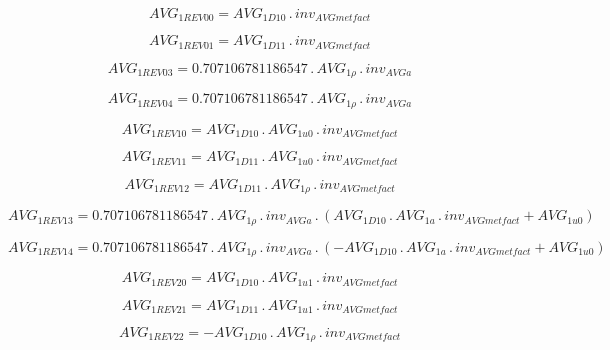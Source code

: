\documentclass{article}
\begin{document}
\begin{dmath}AVG_{1 REV 00} = AVG_{1 D10} \,.\, inv_{AVG met fact}\end{dmath}

\begin{dmath}AVG_{1 REV 01} = AVG_{1 D11} \,.\, inv_{AVG met fact}\end{dmath}

\begin{dmath}AVG_{1 REV 03} = 0.707106781186547 \,.\, AVG_{1 \rho} \,.\, inv_{AVG a}\end{dmath}

\begin{dmath}AVG_{1 REV 04} = 0.707106781186547 \,.\, AVG_{1 \rho} \,.\, inv_{AVG a}\end{dmath}

\begin{dmath}AVG_{1 REV 10} = AVG_{1 D10} \,.\, AVG_{1 u0} \,.\, inv_{AVG met fact}\end{dmath}

\begin{dmath}AVG_{1 REV 11} = AVG_{1 D11} \,.\, AVG_{1 u0} \,.\, inv_{AVG met fact}\end{dmath}

\begin{dmath}AVG_{1 REV 12} = AVG_{1 D11} \,.\, AVG_{1 \rho} \,.\, inv_{AVG met fact}\end{dmath}

\begin{dmath}AVG_{1 REV 13} = 0.707106781186547 \,.\, AVG_{1 \rho} \,.\, inv_{AVG a} \,.\, \left(AVG_{1 D10} \,.\, AVG_{1 a} \,.\, inv_{AVG met fact} + AVG_{1 u0}\right)\end{dmath}

\begin{dmath}AVG_{1 REV 14} = 0.707106781186547 \,.\, AVG_{1 \rho} \,.\, inv_{AVG a} \,.\, \left(- AVG_{1 D10} \,.\, AVG_{1 a} \,.\, inv_{AVG met fact} + AVG_{1 u0}\right)\end{dmath}

\begin{dmath}AVG_{1 REV 20} = AVG_{1 D10} \,.\, AVG_{1 u1} \,.\, inv_{AVG met fact}\end{dmath}

\begin{dmath}AVG_{1 REV 21} = AVG_{1 D11} \,.\, AVG_{1 u1} \,.\, inv_{AVG met fact}\end{dmath}

\begin{dmath}AVG_{1 REV 22} = - AVG_{1 D10} \,.\, AVG_{1 \rho} \,.\, inv_{AVG met fact}\end{dmath}
\end{document}
